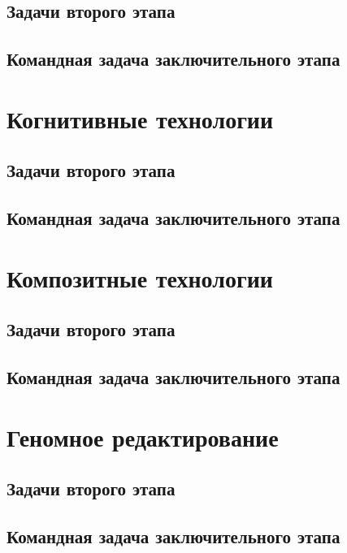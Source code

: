 \documentclass[a4paper,12pt,oneside]{book}
\begin{document}
\chapter{Задачи второго этапа}

\clearpage
\chapter{Командная задача заключительного этапа}


\part{Когнитивные технологии}
\clearpage
\chapter{Задачи второго этапа}

\clearpage
\chapter{Командная задача заключительного этапа}


\part{Композитные технологии}
\clearpage
\chapter{Задачи второго этапа}

\clearpage
\chapter{Командная задача заключительного этапа}


\part{Геномное редактирование}
\clearpage
\chapter{Задачи второго этапа}

\clearpage
\chapter{Командная задача заключительного этапа}
\end{document}
